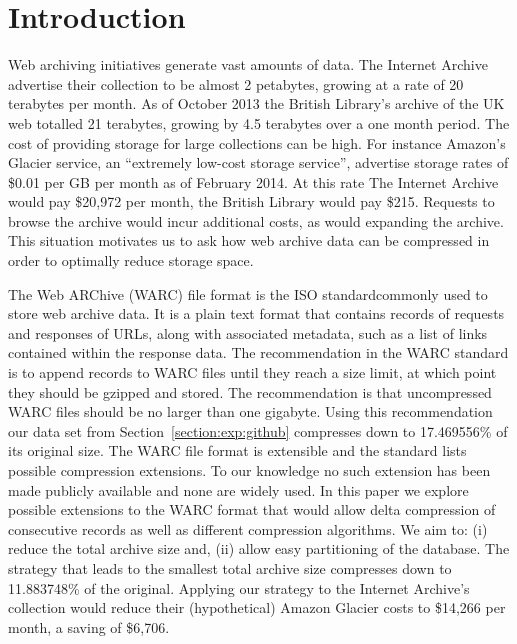 \documentclass[11pt]{article}
\begin{document}
\section{Introduction}

Web archiving initiatives generate vast amounts of data. The Internet Archive advertise their collection to be almost 2 petabytes, growing at a rate of 20 terabytes per month\footnotemark. As of October 2013 the British Library's archive of the UK web totalled 21 terabytes, growing by 4.5 terabytes over a one month period\footnotemark. The cost of providing storage for large collections can be high. For instance Amazon's Glacier service, an ``extremely low-cost storage service'', advertise storage rates of \$0.01 per GB per month as of February 2014. At this rate The Internet Archive would pay \$20,972 per month, the British Library would pay \$215. Requests to browse the archive would incur additional costs, as would expanding the archive. This situation motivates us to ask how web archive data can be compressed in order to optimally reduce storage space.

The Web ARChive (WARC) file format is the ISO standard\footnotemark commonly used to store web archive data. It is a plain text format that contains records of requests and responses of URLs, along with associated metadata, such as a list of links contained within the response data. The recommendation in the WARC standard is to append records to WARC files until they reach a size limit, at which point they should be gzipped and stored. The recommendation is that uncompressed WARC files should be no larger than one gigabyte. Using this recommendation our data set from Section~\ref{section:exp:github} compresses down to 17.469556\% of its original size. The WARC file format is extensible and the standard lists possible compression extensions. To our knowledge no such extension has been made publicly available and none are widely used. In this paper we explore possible extensions to the WARC format that would allow delta compression of consecutive records as well as different compression algorithms. We aim to: (i) reduce the total archive size and, (ii) allow easy partitioning of the database. The strategy that leads to the smallest total archive size compresses down to 11.883748\% of the original. Applying our strategy to the Internet Archive's collection would reduce their (hypothetical) Amazon Glacier costs to \$14,266 per month, a saving of \$6,706.

\end{document}
